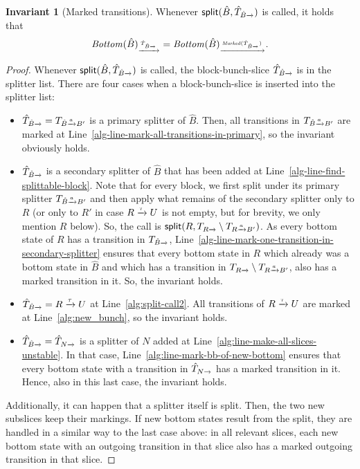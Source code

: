 \documentclass[a4paper,10pt]{article}
\theoremstyle{definition}
\newtheorem{invariant}[definition]{Invariant}
\theoremstyle{plain}
\newcommand{\pijl}[1]{\mathrel{\text{$\xrightarrow{\smash[t]{#1}}$}}}
\newcommand{\Bottom}{\mathit{Bottom}}
\newcommand{\Marked}{\mathit{Marked}}
\begin{document}
\begin{invariant}[Marked transitions]
\label{inv:marked_transitions}
Whenever $\mathsf{split}(\hat{B}, \hat{T}_{\smash[t]{\hat{B}}\pijl{}})$ is called,
it holds that \[\Bottom(\hat{B})_{\pijl{\hat{T}_{\smash[t]{\hat{B}}\pijl{}}}} = \Bottom(\hat{B})_{\pijl{\Marked(\hat{T}_{\smash[t]{\hat{B}}\pijl{}})}}.\]
\end{invariant}
\begin{proof}
Whenever $\mathsf{split}(\hat{B}, \hat{T}_{\smash[t]{\hat{B}}\pijl{}})$ is called,
the block-bunch-slice $\hat{T}_{\smash[t]{\hat{B}}\pijl{}}$ is in the splitter list.
There are four cases when a block-bunch-slice is inserted into the splitter list:
\begin{itemize}
\item	$\hat{T}_{\smash[t]{\hat{B}}\pijl{}} = T_{\smash[t]{\hat{B}}\pijl{a}B'}$ is a primary splitter of $\hat{B}$.
	Then, all transitions in $T_{\smash[t]{\hat{B}}\pijl{a}B'}$ are marked at Line~\ref{alg-line-mark-all-transitions-in-primary},
	so the invariant obviously holds.
\item	$\hat{T}_{\smash[t]{\hat{B}}\pijl{}}$ is a secondary splitter of $\hat{B}$ that has been added at Line~\ref{alg-line-find-splittable-block}.
	Note that for every block, we first split under its primary splitter $T_{\smash[t]{\hat{B}}\pijl{a}B'}$
	and then apply what remains of the secondary splitter only to $R$
	(or only to $R'$ in case $R \pijl{\tau} U$ is not empty,
	but for brevity, we only mention $R$ below).
	So, the call is $\mathsf{split}(R, T_{R\pijl{}} \setminus T_{R\pijl{a}B'})$.
	As every bottom state of $R$ has a transition in $T_{\smash[t]{\hat{B}}\pijl{}}$,
	Line~\ref{alg-line-mark-one-transition-in-secondary-splitter} ensures
	that every bottom state in $R$
	which already was a bottom state in $\hat{B}$
	and which has a transition in $T_{R\pijl{}} \setminus T_{R\pijl{a}B'}$,
	also has a marked transition in it.
	So, the invariant holds.
\item	$\hat{T}_{\smash[t]{\hat{B}}\pijl{}} = R \pijl{\tau} U$ at Line~\ref{alg:split-call2}.
	All transitions of $R \pijl{\tau} U$ are marked at Line~\ref{alg:new_bunch},
	so the invariant holds.
\item	$\hat{T}_{\smash[t]{\hat{B}}\pijl{}} = \hat{T}_{N\pijl{}}$ is a splitter of $N$ added at Line~\ref{alg:line-make-all-slices-unstable}.
	In that case, Line~\ref{alg:line-mark-bb-of-new-bottom} ensures
	that every bottom state with a transition in $\hat{T}_{N\pijl{}}$ has a marked transition in it.
	Hence, also in this last case, the invariant holds.
\end{itemize}
Additionally, it can happen that a splitter itself is split.
Then, the two new subslices keep their markings.
If new bottom states result from the split,
they are handled in a similar way to the last case above:
in all relevant slices, each new bottom state with an outgoing transition in that slice also has a marked outgoing transition in that slice.
\end{proof}
\end{document}

